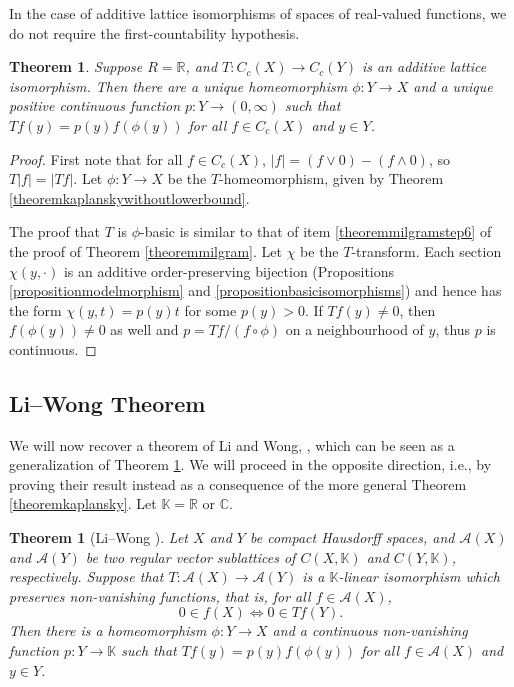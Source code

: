 \documentclass[letter,11pt]{amsart}
\theoremstyle{plain}		\newtheorem{theorem}[generalnumbering]{Theorem}
\theoremstyle{plain}		\newtheorem{corollary}[generalnumbering]{Corollary}
\theoremstyle{definition}		\newtheorem{definition}[generalnumbering]{Definition}
\theoremstyle{definition}		\newtheorem{example}[generalnumbering]{Example}
\theoremstyle{plain}		\newtheorem{proposition}[generalnumbering]{Proposition}
\theoremstyle{plain}		\newtheorem{lemma}[generalnumbering]{Lemma}
\theoremstyle{definition}
\begin{document}
In the case of additive lattice isomorphisms of spaces of real-valued functions, we do not require the first-countability hypothesis.

\begin{theorem}\label{theoremadditivekaplansky}
	Suppose $R=\mathbb{R}$, and $T\colon C_c(X)\to C_c(Y)$ is an additive lattice isomorphism. Then there are a unique homeomorphism $\phi\colon Y\to X$ and a unique positive continuous function $p\colon Y\to (0,\infty)$ such that $Tf(y)=p(y)f(\phi(y))$ for all $f\in C_c(X)$ and $y\in Y$.
\end{theorem}
\begin{proof}
	
	First note that for all $f\in C_c(X)$, $|f|=(f\lor 0)-(f\land 0)$, so $T|f|=|Tf|$. Let $\phi\colon Y\to X$ be the $T$-homeomorphism, given by Theorem \ref{theoremkaplanskywithoutlowerbound}.
	
	The proof that $T$ is $\phi$-basic is similar to that of item \ref{theoremmilgramstep6} of the proof of Theorem \ref{theoremmilgram}. Let $\chi$ be the $T$-transform. Each section $\chi(y,\cdot)$ is an additive order-preserving bijection (Propositions \ref{propositionmodelmorphism} and \ref{propositionbasicisomorphisms}) and hence has the form $\chi(y,t)=p(y)t$ for some $p(y)>0$. If $Tf(y)\neq 0$, then $f(\phi(y))\neq 0$ as well and $p=Tf/(f\circ \phi)$ on a neighbourhood of $y$, thus $p$ is continuous.\qedhere
\end{proof}


\subsection{Li--Wong Theorem}\label{subsectionliwong}

We will now recover a theorem of Li and Wong, \cite[Theorem 2.2]{MR3162258}, which can be seen as a generalization of Theorem \ref{theoremadditivekaplansky}. We will proceed in the opposite direction, i.e., by proving their result instead as a consequence of the more general Theorem \ref{theoremkaplansky}. Let $\mathbb{K}=\mathbb{R}$ or $\mathbb{C}$.

\begin{theorem}[Li--Wong \cite{MR3162258}]\label{theoremliwong}
	Let $X$ and $Y$ be compact Hausdorff spaces, and $\mathcal{A}(X)$ and $\mathcal{A}(Y)$ be two regular vector sublattices of $C(X,\mathbb{K})$ and $C(Y,\mathbb{K})$, respectively. Suppose that $T\colon \mathcal{A}(X)\to \mathcal{A}(Y)$ is a $\mathbb{K}$-linear isomorphism which preserves non-vanishing functions, that is, for all $f\in\mathcal{A}(X)$,
	\[0\in f(X)\iff 0\in Tf(Y).\]
	Then there is a homeomorphism $\phi\colon Y\to X$ and a continuous non-vanishing function $p\colon Y\to\mathbb{K}$ such that $Tf(y)=p(y)f(\phi(y))$ for all $f\in\mathcal{A}(X)$ and $y\in Y$.
\end{theorem}
\end{document}
